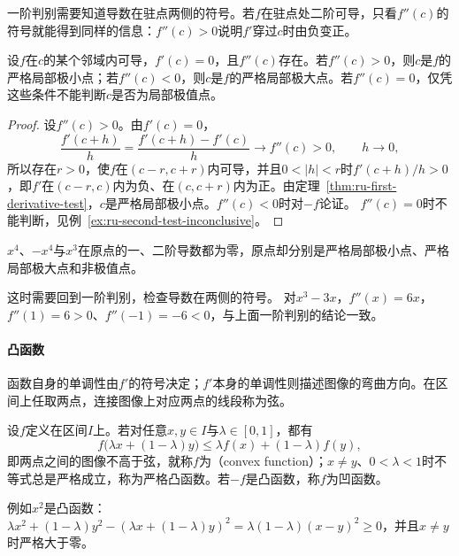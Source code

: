 一阶判别需要知道导数在驻点两侧的符号。若$f$在驻点处二阶可导，只看$f''(c)$的符号就能得到同样的信息：$f''(c)>0$说明$f'$穿过$c$时由负变正。
\begin{theorem}[驻点的二阶判别]
\label{thm:ru-second-derivative-test}
设$f$在$c$的某个邻域内可导，$f'(c)=0$，且$f''(c)$存在。若$f''(c)>0$，则$c$是$f$的严格局部极小点；若$f''(c)<0$，则$c$是$f$的严格局部极大点。若$f''(c)=0$，仅凭这些条件不能判断$c$是否为局部极值点。
\end{theorem}
\begin{proof}
设$f''(c)>0$。由$f'(c)=0$，
\[
 \frac{f'(c+h)}h=\frac{f'(c+h)-f'(c)}h\to f''(c)>0,\qquad h\to0,
\]
所以存在$r>0$，使$f$在$(c-r,c+r)$内可导，并且$0<|h|<r$时$f'(c+h)/h>0$，即$f'$在$(c-r,c)$内为负、在$(c,c+r)$内为正。由定理~\ref{thm:ru-first-derivative-test}，$c$是严格局部极小点。$f''(c)<0$时对$-f$论证。
$f''(c)=0$时不能判断，见例~\ref{ex:ru-second-test-inconclusive}。
\end{proof}
\begin{example}[二阶判别失效的三个函数]
\label{ex:ru-second-test-inconclusive}
$x^4$、$-x^4$与$x^3$在原点的一、二阶导数都为零，原点却分别是严格局部极小点、严格局部极大点和非极值点。
\end{example}
这时需要回到一阶判别，检查导数在两侧的符号。
对$x^3-3x$，$f''(x)=6x$，$f''(1)=6>0$、$f''(-1)=-6<0$，与上面一阶判别的结论一致。

\paragraph{凸函数}
函数自身的单调性由$f'$的符号决定；$f'$本身的单调性则描述图像的弯曲方向。在区间上任取两点，连接图像上对应两点的线段称为弦。
\begin{definition}[凸函数]
\label{def:ru-convex-function}
设$f$定义在区间$I$上。若对任意$x,y\in I$与$\lambda\in[0,1]$，都有
\[
 f\bigl(\lambda x+(1-\lambda)y\bigr)\leq\lambda f(x)+(1-\lambda)f(y),
\]
即两点之间的图像不高于弦，就称$f$为（convex function）；$x\neq y$、$0<\lambda<1$时不等式总是严格成立，称为严格凸函数。若$-f$是凸函数，称$f$为凹函数。
\end{definition}
例如$x^2$是凸函数：$\lambda x^2+(1-\lambda)y^2-(\lambda x+(1-\lambda)y)^2=\lambda(1-\lambda)(x-y)^2\geq0$，并且$x\neq y$时严格大于零。

